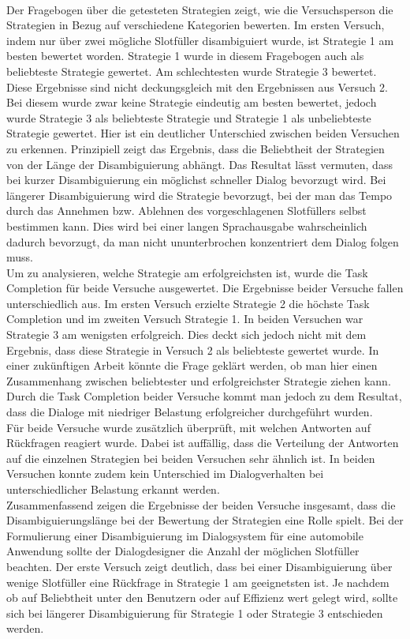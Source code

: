 \documentclass[12pt,a4paper]{scrartcl}
\begin{document}
\\
Der Fragebogen über die getesteten Strategien zeigt, wie die Versuchsperson die Strategien in Bezug auf verschiedene Kategorien bewerten. Im ersten Versuch, indem nur über zwei mögliche Slotfüller disambiguiert wurde, ist Strategie 1 am besten bewertet worden. Strategie 1 wurde in diesem Fragebogen auch als beliebteste Strategie gewertet. Am schlechtesten wurde Strategie 3 bewertet. Diese Ergebnisse sind nicht deckungsgleich mit den Ergebnissen aus Versuch 2. Bei diesem wurde zwar keine Strategie eindeutig am besten bewertet, jedoch wurde Strategie 3 als beliebteste Strategie und Strategie 1 als unbeliebteste Strategie gewertet. Hier ist ein deutlicher Unterschied zwischen beiden Versuchen zu erkennen. Prinzipiell zeigt das Ergebnis, dass die Beliebtheit der Strategien von der Länge der Disambiguierung abhängt. Das Resultat lässt vermuten, dass bei kurzer Disambiguierung ein möglichst schneller Dialog bevorzugt wird. Bei längerer Disambiguierung wird die Strategie bevorzugt, bei der man das Tempo durch das Annehmen bzw. Ablehnen des vorgeschlagenen Slotfüllers selbst bestimmen kann. Dies wird bei einer langen Sprachausgabe wahrscheinlich dadurch bevorzugt, da man nicht ununterbrochen konzentriert dem Dialog folgen muss. \\
\newline
Um zu analysieren, welche Strategie am erfolgreichsten ist, wurde die Task Completion für beide Versuche ausgewertet. Die Ergebnisse beider Versuche fallen unterschiedlich aus. Im ersten Versuch erzielte Strategie 2 die höchste Task Completion und im zweiten Versuch Strategie 1. In beiden Versuchen war Strategie 3 am wenigsten erfolgreich. Dies deckt sich jedoch nicht mit dem Ergebnis, dass diese Strategie in Versuch 2 als beliebteste gewertet wurde. In einer zukünftigen Arbeit könnte die Frage geklärt werden, ob man hier einen Zusammenhang zwischen beliebtester und erfolgreichster Strategie ziehen kann. 
Durch die Task Completion beider Versuche kommt man jedoch zu dem Resultat, dass die Dialoge mit niedriger Belastung erfolgreicher durchgeführt wurden. \\
\newline
Für beide Versuche wurde zusätzlich überprüft, mit welchen Antworten auf Rückfragen reagiert wurde. Dabei ist auffällig, dass die Verteilung der Antworten auf die einzelnen Strategien bei beiden Versuchen sehr ähnlich ist. In beiden Versuchen konnte zudem kein Unterschied im Dialogverhalten bei unterschiedlicher Belastung erkannt werden. \\
\newline
Zusammenfassend zeigen die Ergebnisse der beiden Versuche insgesamt, dass die Disambiguierungslänge bei der Bewertung der Strategien eine Rolle spielt. Bei der Formulierung einer Disambiguierung im Dialogsystem für eine automobile Anwendung sollte der Dialogdesigner die Anzahl der möglichen Slotfüller beachten. Der erste Versuch zeigt deutlich, dass bei einer Disambiguierung über wenige Slotfüller eine Rückfrage in Strategie 1 am geeignetsten ist. Je nachdem ob auf Beliebtheit unter den Benutzern oder auf Effizienz  wert gelegt wird, sollte sich bei längerer Disambiguierung für Strategie 1 oder Strategie 3 entschieden werden. 
\end{document}
